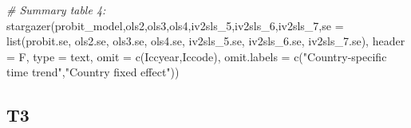 \documentclass[
]{article}
\newenvironment{Shaded}{\begin{snugshade}}{\end{snugshade}}
\newcommand{\AttributeTok}[1]{\textcolor[rgb]{0.77,0.63,0.00}{#1}}
\newcommand{\CommentTok}[1]{\textcolor[rgb]{0.56,0.35,0.01}{\textit{#1}}}
\newcommand{\FunctionTok}[1]{\textcolor[rgb]{0.00,0.00,0.00}{#1}}
\newcommand{\NormalTok}[1]{#1}
\newcommand{\StringTok}[1]{\textcolor[rgb]{0.31,0.60,0.02}{#1}}
\begin{document}
\begin{Shaded}
\begin{Highlighting}[]
\CommentTok{\# Summary table 4:}
\FunctionTok{stargazer}\NormalTok{(probit\_model,ols2,ols3,ols4,iv2sls\_5,iv2sls\_6,iv2sls\_7,}\AttributeTok{se =} \FunctionTok{list}\NormalTok{(probit.se, ols2.se, ols3.se, ols4.se, iv2sls\_5.se, iv2sls\_6.se, iv2sls\_7.se), }\AttributeTok{header =}\NormalTok{ F, }\AttributeTok{type =} \StringTok{\textquotesingle{}text\textquotesingle{}}\NormalTok{, }\AttributeTok{omit =} \FunctionTok{c}\NormalTok{(}\StringTok{\textquotesingle{}Iccyear\textquotesingle{}}\NormalTok{,}\StringTok{\textquotesingle{}Iccode\textquotesingle{}}\NormalTok{), }\AttributeTok{omit.labels =} \FunctionTok{c}\NormalTok{(}\StringTok{"Country{-}speciﬁc time trend"}\NormalTok{,}\StringTok{"Country fixed effect"}\NormalTok{))}
\end{Highlighting}
\end{Shaded}

\hypertarget{t3}{%
\subsection{T3}\label{t3}}
\end{document}
